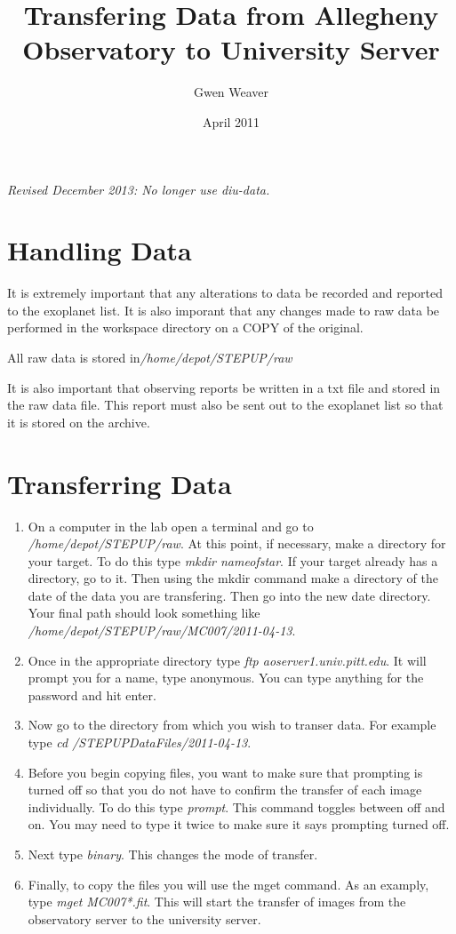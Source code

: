 \documentclass[10pt,preprint]{aastex}
\begin{document}
\title{Transfering Data from Allegheny Observatory to University Server}
\author{Gwen Weaver}
\date{April 2011}

\emph{Revised December 2013: No longer use diu-data.}

\section{Handling Data}

It is extremely important that any alterations to data be recorded and reported to the exoplanet list. It is also imporant that any changes made to raw data be performed in the workspace directory on a COPY of the original. 


All raw data is stored in\emph{/home/depot/STEPUP/raw}

It is also important that observing reports be written in a txt file and stored in the raw data file. This report must also be sent out to the exoplanet list so that it is stored on the archive. 

\section{Transferring Data}
\begin{enumerate}

\item On a computer in the lab open a terminal and go to \emph{/home/depot/STEPUP/raw}. At this point, if necessary, make a directory for your target. To do this type \emph{mkdir nameofstar}. If your target already has a directory, go to it. Then using the mkdir command make a directory of the date of the data you are transfering. Then go into the new date directory. Your final path should look something like \emph{/home/depot/STEPUP/raw/MC007/2011-04-13}. 

\item Once in the appropriate directory type \emph{ftp aoserver1.univ.pitt.edu}. It will prompt you for a name, type anonymous. You can type anything for the password and hit enter. 

\item Now go to the directory from which you wish to transer data. For example type \emph{cd /STEPUPDataFiles/2011-04-13}. 

\item Before you begin copying files, you want to make sure that prompting is turned off so that you do not have to confirm the transfer of each image individually. To do this type  \emph{prompt}. This command toggles between off and on. You may need to type it twice to make sure it says prompting turned off. 

\item Next type \emph{binary}. This changes the mode of transfer.

\item Finally, to copy the files you will use the mget command. As an examply, type \emph{mget MC007*.fit}. This will start the transfer of images from the observatory server to the university server. 
\end{enumerate}
\end{document}
